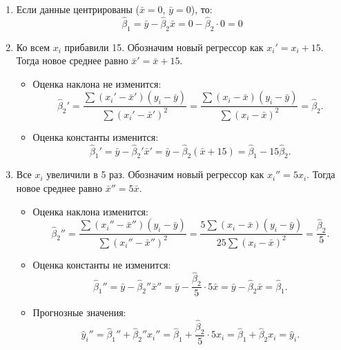\documentclass[12pt]{article}
\begin{document}
\begin{sol}
\begin{enumerate}
    \item Если данные центрированы ($\bar{x} = 0$, $\bar{y} = 0$), то:
    \[
    \hat{\beta}_1 = \bar{y} - \hat{\beta}_2 \bar{x} = 0 - \hat{\beta}_2 \cdot 0 = 0
    \]

    \item Ко всем $x_i$ прибавили 15. Обозначим новый регрессор как $x_i' = x_i + 15$. Тогда новое среднее равно $\bar{x}' = \bar{x} + 15$.
    \begin{itemize}
        \item Оценка наклона не изменится:
        \[
        \hat{\beta}_2' = \frac{\sum (x_i' - \bar{x}')(y_i - \bar{y})}{\sum (x_i' - \bar{x}')^2} = \frac{\sum (x_i - \bar{x})(y_i - \bar{y})}{\sum (x_i - \bar{x})^2} = \hat{\beta}_2.
        \]
        \item Оценка константы изменится:
        \[
        \hat{\beta}_1' = \bar{y} - \hat{\beta}_2' \bar{x}' = \bar{y} - \hat{\beta}_2 (\bar{x} + 15) = \hat{\beta}_1 - 15 \hat{\beta}_2.
        \]
    \end{itemize}

    \item Все $x_i$ увеличили в 5 раз. Обозначим новый регрессор как $x_i'' = 5x_i$. Тогда новое среднее равно $\bar{x}'' = 5\bar{x}$.
    \begin{itemize}
        \item Оценка наклона изменится:
        \[
        \hat{\beta}_2'' = \frac{\sum (x_i'' - \bar{x}'')(y_i - \bar{y})}{\sum (x_i'' - \bar{x}'')^2} = \frac{5 \sum (x_i - \bar{x})(y_i - \bar{y})}{25 \sum (x_i - \bar{x})^2} = \frac{\hat{\beta}_2}{5}.
        \]
        \item Оценка константы не изменится:
        \[
        \hat{\beta}_1'' = \bar{y} - \hat{\beta}_2'' \bar{x}'' = \bar{y} - \frac{\hat{\beta}_2}{5} \cdot 5\bar{x} = \bar{y} - \hat{\beta}_2 \bar{x} = \hat{\beta}_1.
        \]
        \item Прогнозные значения:
        \[
        \hat{y}_i'' = \hat{\beta}_1'' + \hat{\beta}_2'' x_i'' = \hat{\beta}_1 + \frac{\hat{\beta}_2}{5} \cdot 5x_i = \hat{\beta}_1 + \hat{\beta}_2 x_i = \hat{y}_i.
        \]
    \end{itemize}
\end{enumerate}

\end{sol}
\end{document}
